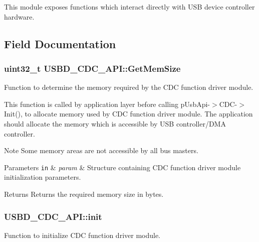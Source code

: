 This module exposes functions which interact directly with U\-S\-B device controller hardware. 



\subsection{Field Documentation}
\hypertarget{structUSBD__CDC__API_abde21c25f0b02b4d3ec9af0e41378437}{
\subsubsection[{Get\-Mem\-Size}]{\setlength{\rightskip}{0pt plus 5cm}uint32\-\_\-t U\-S\-B\-D\-\_\-\-C\-D\-C\-\_\-\-A\-P\-I\-::\-Get\-Mem\-Size}}\label{structUSBD__CDC__API_abde21c25f0b02b4d3ec9af0e41378437}
Function to determine the memory required by the C\-D\-C function driver module.

This function is called by application layer before calling p\-Usb\-Api-\/$>$C\-D\-C-\/$>$Init(), to allocate memory used by C\-D\-C function driver module. The application should allocate the memory which is accessible by U\-S\-B controller/\-D\-M\-A controller. \begin{DoxyNote}{Note}
Some memory areas are not accessible by all bus masters.
\end{DoxyNote}

\begin{DoxyParams}[1]{Parameters}
\mbox{\tt in}  & {\em param} & Structure containing C\-D\-C function driver module initialization parameters. \\
\hline
\end{DoxyParams}
\begin{DoxyReturn}{Returns}
Returns the required memory size in bytes. 
\end{DoxyReturn}
\hypertarget{structUSBD__CDC__API_a3c3f8725643c607bca1cf3f422dc5702}{
\subsubsection[{init}]{ U\-S\-B\-D\-\_\-\-C\-D\-C\-\_\-\-A\-P\-I\-::init}}\label{structUSBD__CDC__API_a3c3f8725643c607bca1cf3f422dc5702}
Function to initialize C\-D\-C function driver module.

